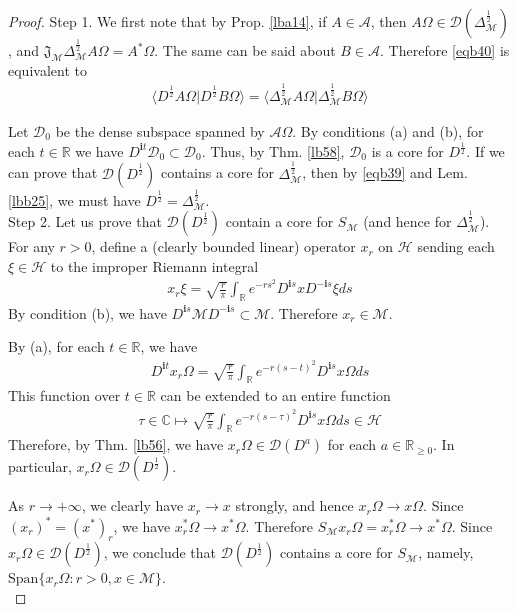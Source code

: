 \documentclass[12pt,b5paper,notitlepage]{article}
\theoremstyle{definition}
\theoremstyle{plain}
\newcommand{\fk}{\mathfrak}
\newcommand{\mc}{\mathcal}
\newcommand{\Dom}{\scr{D}}
\newcommand{\Span}{\mathrm{Span}}
\newcommand{\bk}[1]{\langle {#1}\rangle}
\newcommand{\scr}{\mathscr}
\newcommand{\im}{\mathbf{i}}
\newcommand{\Cbb}{\mathbb C}
\newcommand{\Rbb}{\mathbb R}
\numberwithin{equation}{section}
\begin{document}
\begin{proof}
Step 1. We first note that by  Prop. \ref{lba14}, if $A\in\scr A$, then $A\Omega\in\Dom(\Delta_{\mc M}^{\frac 12})$, and $\fk J_{\mc M}\Delta_{\mc M}^{\frac 12}A\Omega=A^*\Omega$. The same can be said about $B\in\scr A$. Therefore \eqref{eqb40} is equivalent to
\begin{align}\label{eqb39}
\bk{D^{\frac 12}A\Omega|D^{\frac 12}B\Omega}=\bk{\Delta_{\mc M}^{\frac 12}A\Omega|\Delta_{\mc M}^{\frac 12}B\Omega}
\end{align}

Let $\Dom_0$ be the dense subspace spanned by $\scr A\Omega$. By conditions (a) and (b), for each $t\in\Rbb$ we have $D^{\im t}\Dom_0\subset\Dom_0$. Thus, by Thm. \ref{lb58}, $\Dom_0$ is a core for $D^{\frac 12}$. If we can prove that $\Dom(D^{\frac 12})$ contains a core for $\Delta_{\mc M}^{\frac 12}$, then by \eqref{eqb39} and Lem. \ref{lbb25}, we must have $D^{\frac 12}=\Delta_{\mc M}^{\frac 12}$.\\[-1ex]

Step 2. Let us prove that $\Dom(D^{\frac 12})$ contain a core for $S_{\mc M}$ (and hence for $\Delta_{\mc M}^{\frac 12}$). For any $r>0$, define a (clearly bounded linear) operator $x_r$ on $\mc H$ sending each $\xi\in\mc H$ to the improper Riemann integral
\begin{align}
x_r\xi=\sqrt{\frac r\pi} \int_\Rbb e^{-rs^2}D^{\im s}xD^{-\im s}\xi ds
\end{align}
By condition (b), we have $D^{\im s}\mc MD^{-\im s}\subset\mc M$. Therefore $x_r\in\mc M$.

By (a), for each $t\in\Rbb$, we have
\begin{align*}
D^{\im t}x_r\Omega=\sqrt{\frac r\pi} \int_\Rbb e^{-r(s-t)^2}D^{\im s}x\Omega ds
\end{align*}
This function over $t\in\Rbb$ can be extended to an entire function
\begin{align*}
\tau\in\Cbb\mapsto \sqrt{\frac r\pi} \int_\Rbb e^{-r(s-\tau)^2}D^{\im s}x\Omega ds\in\mc H
\end{align*}
Therefore, by Thm. \ref{lb56}, we have $x_r\Omega\in\Dom(D^a)$ for each $a\in\Rbb_{\geq0}$. In particular, $x_r\Omega\in\Dom(D^{\frac 12})$. 

As $r\rightarrow+\infty$, we clearly have $x_r\rightarrow x$ strongly, and hence $x_r\Omega\rightarrow x\Omega$. Since $(x_r)^*=(x^*)_r$, we have $x_r^*\Omega\rightarrow x^*\Omega$. Therefore $S_{\mc M}x_r\Omega=x_r^*\Omega\rightarrow x^*\Omega$. Since $x_r\Omega\in\Dom(D^{\frac 12})$, we conclude that $\Dom(D^{\frac 12})$ contains a core for $S_{\mc M}$, namely, $\Span\{x_r\Omega:r>0,x\in\mc M\}$.\\[-1ex]


\end{proof}
\end{document}

